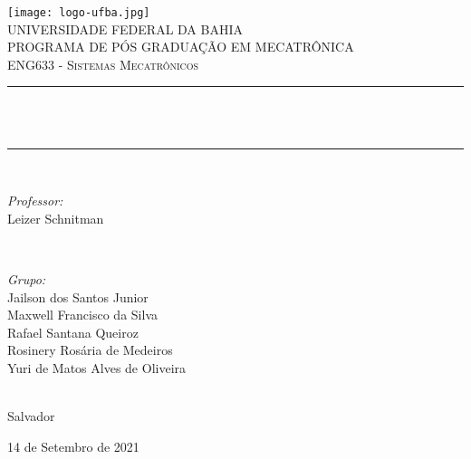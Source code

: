 \begin{titlepage}
	\centering
	\texttt{[image: logo-ufba.jpg]}\\[0.5 cm]	%
	\textsc{\LARGE UNIVERSIDADE FEDERAL DA BAHIA}\\[0.5 cm]	%
	\textsc{\large PROGRAMA DE PÓS GRADUAÇÃO EM MECATRÔNICA}\\[1 cm]
	\textsc{\Large ENG633 - Sistemas Mecatrônicos}\\[0.5 cm]				%
	\rule{\linewidth}{0.2 mm} \\
	{ \huge \bfseries \thetitle}\\
	\rule{\linewidth}{0.2 mm} \\[1 cm]
	
	\begin{minipage}{0.5\textwidth}
		\begin{flushleft} \large
			\emph{Professor:}\\
			Leizer Schnitman\\
		\end{flushleft}
	\end{minipage}~
	\begin{minipage}{0.5\textwidth}
		
		\begin{flushright} \large
			\emph{Grupo:} \\
			Jailson dos Santos Junior\\
			Maxwell Francisco da Silva\\
			Rafael Santana Queiroz\\
			Rosinery Rosária de Medeiros\\
			Yuri de Matos Alves de Oliveira
		\end{flushright}
		
	\end{minipage}\\[1.0 cm]
	
	
	Salvador
	
	14 de Setembro de 2021
	
	
	
	
\end{titlepage}